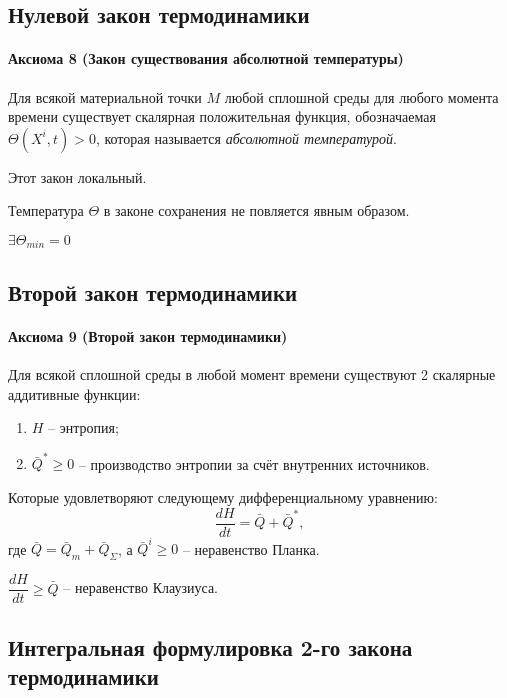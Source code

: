 \subsection{Нулевой закон термодинамики}

\paragraph{Аксиома 8 (Закон существования абсолютной температуры)}
Для всякой материальной точки $M$ любой сплошной среды для любого момента времени существует
скалярная положительная функция, обозначаемая $\Theta(X^i, t) > 0$, которая называется
\emph{абсолютной температурой}.

\begin{remark}
  Этот закон локальный.
\end{remark}
\begin{remark}
  Температура $\Theta$ в законе сохранения не повляется явным образом.
\end{remark}
\begin{remark}
  $\exists \Theta_{min} = 0$
\end{remark}



\subsection{Второй закон термодинамики}

\paragraph{Аксиома 9 (Второй закон термодинамики)}
Для всякой сплошной среды в любой момент времени существуют 2 скалярные аддитивные
функции:
\begin{enumerate}
  \item $H$ -- энтропия;
  \item $\bar{Q}^* \geqslant 0$ -- производство энтропии за счёт внутренних источников.
\end{enumerate}
Которые удовлетворяют следующему дифференциальному уравнению:
\[
  \dfrac{dH}{dt} = \bar{Q} + \bar{Q}^*,
\]
где $\bar{Q} = \bar{Q}_m + \bar{Q}_\Sigma$,
а $\bar{Q}^i \geqslant 0$ -- неравенство Планка.

\begin{remark}
  $\dfrac{dH}{dt} \geqslant \bar{Q}$ -- неравенство Клаузиуса.
\end{remark}


\subsection{Интегральная формулировка 2-го закона термодинамики}

